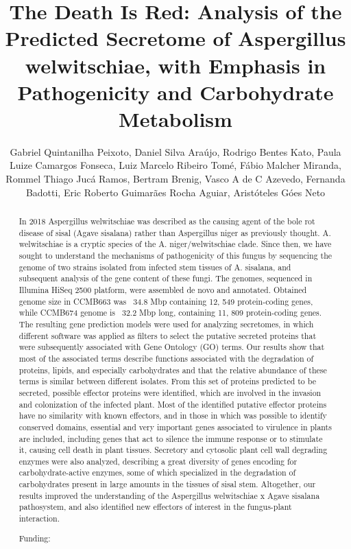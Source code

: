 \documentclass[twoside]{article}
\title{\vspace{-15mm}\fontsize{24pt}{10pt}\selectfont\textbf{ The Death Is Red: Analysis of the Predicted Secretome of Aspergillus welwitschiae,  with Emphasis in Pathogenicity and Carbohydrate Metabolism }} %
\author{ Gabriel Quintanilha Peixoto, Daniel Silva Ara\'ujo, Rodrigo Bentes Kato, Paula Luize Camargos Fonseca, Luiz Marcelo Ribeiro Tom\'e, F\'abio Malcher Miranda, Rommel Thiago Juc\'a Ramos, Bertram Brenig, Vasco A de C Azevedo, Fernanda Badotti, Eric Roberto Guimar\~aes Rocha Aguiar, Arist\'oteles G\'oes Neto }
\affil{ University G\"ottingen }
\date{}
\begin{document}
  
  
  \maketitle %
  
  
  \thispagestyle{fancy} %
  
  
  \begin{abstract}
  In 2018 Aspergillus welwitschiae was described as the causing agent of the bole rot disease of sisal (Agave sisalana) rather than Aspergillus niger as previously thought. A. welwitschiae is a cryptic species of the A. niger/welwitschiae clade. Since then,  we have sought to understand the mechanisms of pathogenicity of this fungus by sequencing the genome of two strains isolated from infected stem tissues of A. sisalana,   and subsequent analysis of the gene content of these fungi. The genomes,  sequenced in Illumina HiSeq 2500 platform,  were assembled de novo and annotated. Obtained genome size in CCMB663 was ~34.8 Mbp containing 12, 549 protein-coding genes,  while CCMB674 genome is ~32.2 Mbp long,  containing 11, 809 protein-coding genes. The resulting gene prediction models were used for analyzing secretomes,  in which different software was applied as filters to select the putative secreted proteins that were subsequently associated with Gene Ontology (GO) terms. Our results show that most of the associated terms describe functions associated with the degradation of proteins,  lipids,  and especially carbohydrates and that the relative abundance of these terms is similar between different isolates. From this set of proteins predicted to be secreted,  possible effector proteins were identified,  which are involved in the invasion and colonization of the infected plant. Most of the identified putative effector proteins have no similarity with known effectors,  and in those in which was possible to identify conserved domains,  essential and very important genes associated to virulence in plants are included,  including genes that act to silence the immune response or to stimulate it,  causing cell death in plant tissues. Secretory and cytosolic plant cell wall degrading enzymes were also analyzed,  describing a great diversity of genes encoding for carbohydrate-active enzymes,  some of which specialized in the degradation of carbohydrates present in large amounts in the tissues of sisal stem. Altogether,  our results improved the understanding of the Aspergillus welwitschiae x Agave sisalana pathosystem,  and also identified new effectors of interest in the fungus-plant interaction.
  
  Funding:  \\ 
  \end{abstract}
  
\end{document}
